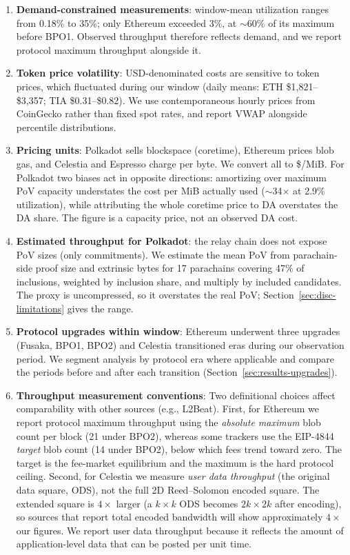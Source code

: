 \begin{enumerate}
    \item \textbf{Demand-constrained measurements}: window-mean utilization ranges from 0.18\% to 35\%; only Ethereum exceeded 3\%, at $\sim$60\% of its maximum before BPO1. Observed throughput therefore reflects demand, and we report protocol maximum throughput alongside it.

    \item \textbf{Token price volatility}: USD-denominated costs are sensitive to token prices, which fluctuated during our window (daily means: ETH \$1,821--\$3,357; TIA \$0.31--\$0.82). We use contemporaneous hourly prices from CoinGecko rather than fixed spot rates, and report VWAP alongside percentile distributions.

    \item \textbf{Pricing units}: Polkadot sells blockspace (coretime), Ethereum prices blob gas, and Celestia and Espresso charge per byte. We convert all to \$/MiB. For Polkadot two biases act in opposite directions: amortizing over maximum PoV capacity understates the cost per MiB actually used ($\sim$34$\times$ at 2.9\% utilization), while attributing the whole coretime price to DA overstates the DA share. The figure is a capacity price, not an observed DA cost.

    \item \textbf{Estimated throughput for Polkadot}: the relay chain does not expose PoV sizes (only commitments). We estimate the mean PoV from parachain-side proof size and extrinsic bytes for 17 parachains covering 47\% of inclusions, weighted by inclusion share, and multiply by included candidates. The proxy is uncompressed, so it overstates the real PoV; Section~\ref{sec:disc-limitations} gives the range.

    \item \textbf{Protocol upgrades within window}: Ethereum underwent three upgrades (Fusaka, BPO1, BPO2) and Celestia transitioned eras during our observation period. We segment analysis by protocol era where applicable and compare the periods before and after each transition (Section~\ref{sec:results-upgrades}).

    \item \textbf{Throughput measurement conventions}: Two definitional choices affect comparability with other sources (e.g., L2Beat).
    First, for Ethereum we report protocol maximum throughput using the \emph{absolute maximum} blob count per block (21 under BPO2), whereas some trackers use the EIP-4844 \emph{target} blob count (14 under BPO2), below which fees trend toward zero. The target is the fee-market equilibrium and the maximum is the hard protocol ceiling.
    Second, for Celestia we measure \emph{user data throughput} (the original data square, ODS), not the full 2D Reed--Solomon encoded square. The extended square is $4\times$ larger (a $k{\times}k$ ODS becomes $2k{\times}2k$ after encoding), so sources that report total encoded bandwidth will show approximately $4\times$ our figures. We report user data throughput because it reflects the amount of application-level data that can be posted per unit time.
\end{enumerate}


